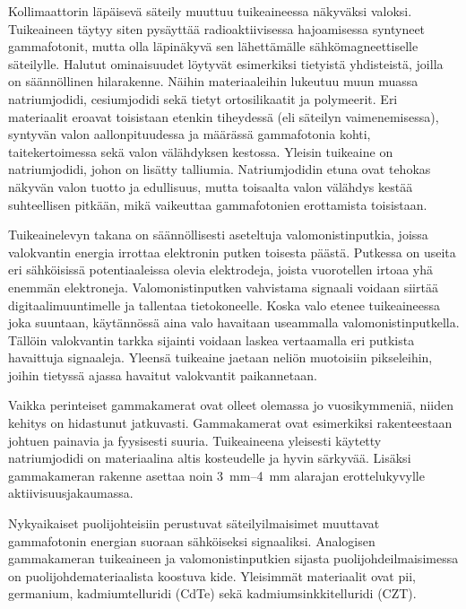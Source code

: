 Kollimaattorin läpäisevä säteily muuttuu tuikeaineessa näkyväksi valoksi. Tuikeaineen täytyy siten pysäyttää radioaktiivisessa hajoamisessa syntyneet gammafotonit, mutta olla läpinäkyvä sen lähettämälle sähkömagneettiselle säteilylle. Halutut ominaisuudet löytyvät esimerkiksi tietyistä yhdisteistä, joilla on säännöllinen hilarakenne. Näihin materiaaleihin lukeutuu muun muassa natriumjodidi, cesiumjodidi sekä tietyt ortosilikaatit ja polymeerit. Eri materiaalit eroavat toisistaan etenkin tiheydessä (eli säteilyn vaimenemisessa), syntyvän valon aallonpituudessa ja määrässä gammafotonia kohti, taitekertoimessa sekä valon välähdyksen kestossa.\cite{knoll_radiation_2010} Yleisin tuikeaine on natriumjodidi, johon on lisätty talliumia\cite{cherry_gamma_2012, cherry_single_2012, knoll_radiation_2010}. Natriumjodidin etuna ovat tehokas näkyvän valon tuotto ja edullisuus, mutta toisaalta valon välähdys kestää suhteellisen pitkään, mikä vaikeuttaa gammafotonien erottamista toisistaan\cite{knoll_radiation_2010}.

Tuikeainelevyn takana on säännöllisesti aseteltuja valomonistinputkia, joissa valokvantin energia irrottaa elektronin putken toisesta päästä. Putkessa on useita eri sähköisissä potentiaaleissa olevia elektrodeja, joista vuorotellen irtoaa yhä enemmän elektroneja. Valomonistinputken vahvistama signaali voidaan siirtää digitaalimuuntimelle ja tallentaa tietokoneelle.\cite{cherry_gamma_2012, knoll_radiation_2010} Koska valo etenee tuikeaineessa joka suuntaan, käytännössä aina valo havaitaan useammalla valomonistinputkella. Tällöin valokvantin tarkka sijainti voidaan laskea vertaamalla eri putkista havaittuja signaaleja. Yleensä tuikeaine jaetaan neliön muotoisiin pikseleihin, joihin tietyssä ajassa havaitut valokvantit paikannetaan\cite{cherry_gamma_2012, knoll_radiation_2010}.

Vaikka perinteiset gammakamerat ovat olleet olemassa jo vuosikymmeniä, niiden kehitys on hidastunut jatkuvasti. Gammakamerat ovat esimerkiksi rakenteestaan johtuen painavia ja fyysisesti suuria. Tuikeaineena yleisesti käytetty natriumjodidi on materiaalina altis kosteudelle ja hyvin särkyvää. Lisäksi gammakameran rakenne asettaa noin \qtyrange{3}{4}{\milli\meter} alarajan erottelukyvylle aktiivisuusjakaumassa.\cite{knoll_radiation_2010, taillefer_scintillation_2022}

Nykyaikaiset puolijohteisiin perustuvat säteilyilmaisimet muuttavat gammafotonin energian suoraan sähköiseksi signaaliksi. Analogisen gammakameran tuikeaineen ja valomonistinputkien sijasta puolijohdeilmaisimessa on puolijohdemateriaalista koostuva kide. Yleisimmät materiaalit ovat pii, germanium, kadmiumtelluridi (CdTe) sekä kadmiumsinkkitelluridi (CZT).

